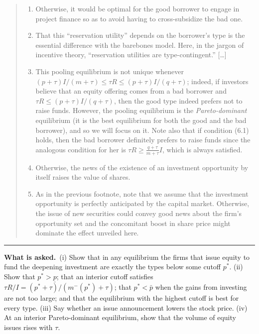 \documentclass[11pt,a4paper]{article}
\newcommand{\asked}{\par\medskip\noindent\textbf{What is asked.}~}
\newcommand{\stmtend}{\par\endgroup\nopagebreak\noindent\rule{\linewidth}{0.4pt}\par\medskip}
\begin{document}
\begin{quote}
\begin{enumerate}
\def\labelenumi{\arabic{enumi}.}
\setcounter{enumi}{21}
\item
  Otherwise, it would be optimal for the good borrower to engage in project finance so as to avoid
  having to cross-subsidize the bad one.
\item
  That this ``reservation utility'' depends on the borrower's type is the essential difference with
  the barebones model. Here, in the jargon of incentive theory, ``reservation utilities are
  type-contingent.'' {[}\ldots{]}
\item
  This pooling equilibrium is not unique whenever
  \((p + \tau)I/(m + \tau) \leqslant \tau R \leqslant (p + \tau)I/(q + \tau)\); indeed, if investors
  believe that an equity offering comes from a bad borrower and
  \(\tau R \leqslant (p + \tau)I/(q + \tau)\), then the good type indeed prefers not to raise funds.
  However, the pooling equilibrium is the \emph{Pareto-dominant} equilibrium (it is the best
  equilibrium for both the good and the bad borrower), and so we will focus on it. Note also that if
  condition (6.1) holds, then the bad borrower definitely prefers to raise funds since the analogous
  condition for her is \(\tau R \geqslant \frac{q + \tau}{m + \tau} I\), which is always satisfied.
\item
  Otherwise, the news of the existence of an investment opportunity by itself raises the value of
  shares.
\item
  As in the previous footnote, note that we assume that the investment opportunity is perfectly
  anticipated by the capital market. Otherwise, the issue of new securities could convey good news
  about the firm's opportunity set and the concomitant boost in share price might dominate the
  effect unveiled here.
\end{enumerate}
\end{quote}
\stmtend

\asked (i) Show that in any equilibrium the firms that issue equity to fund the deepening investment are exactly the types below some cutoff $p^*$. (ii) Show that $p^*>\underline p$; that an interior cutoff satisfies $\tau R/I=(p^*+\tau)/(m^-(p^*)+\tau)$; that $p^*<\bar p$ when the gains from investing are not too large; and that the equilibrium with the highest cutoff is best for every type. (iii) Say whether an issue announcement lowers the stock price. (iv) At an interior Pareto-dominant equilibrium, show that the volume of equity issues rises with $\tau$.
\end{document}
